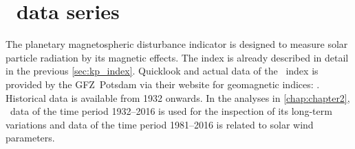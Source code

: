 




\section{\Kp~data series}
\label{sec:kp_data}
The planetary magnetospheric disturbance indicator \Kp{} is designed to measure solar particle radiation by its magnetic effects. The index is already described in detail in the previous \autoref{sec:kp_index}. Quicklook and actual data of the \Kp~index is provided by the GFZ~Potsdam via their website for geomagnetic indices: \mbox{}. Historical data is available from 1932 onwards.
In the analyses in \autoref{chap:chapter2}, \Kp~data of the time period 1932--2016 is used for the inspection of its long-term variations and \Kp{} data of the time period 1981--2016 is related to solar wind parameters.

